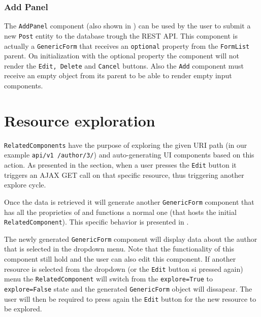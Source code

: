 \subsubsection{Add Panel}
\label{sec:add-panel}

The \texttt{AddPanel} component (also shown in ) can be used by the user to submit a new \texttt{Post} entity to the database trough the REST API. This component is actually a \texttt{GenericForm} that receives an \texttt{optional} property from the \texttt{FormList} parent. On initialization with the optional property the component will not render the \texttt{Edit, Delete} and \texttt{Cancel} buttons. Also the \texttt{Add} component must receive an empty object from its parent to be able to render empty input components.


\section{Resource exploration}
\label{sec:panel-nesting}

\texttt{RelatedComponents} have the purpose of exploring the given URI path (in our example \texttt{api/v1 /author/3/}) and auto-generating UI components based on this action. As presented in the  section, when a user presses the \texttt{Edit} button it triggers an AJAX GET call on that specific resource, thus triggering another explore cycle.

Once the data is retrieved it will generate another \texttt{GenericForm} component that has all the proprieties of and functions a normal one (that hosts the initial \texttt{RelatedComponent}). This specific behavior is presented in .

The newly generated \texttt{GenericForm} component will display data about the author that is selected in the dropdown menu. Note that the functionality of this component still hold and the user can also edit this component. If another resource is selected from the dropdown (or the \texttt{Edit} button si pressed again) menu the \texttt{RelatedComponent} will switch from the \texttt{explore=True} to \texttt{explore=False} state and the generated \texttt{GenericForm} object will dissapear. The user will then be required to press again the \texttt{Edit} button for the new resource to be explored.


